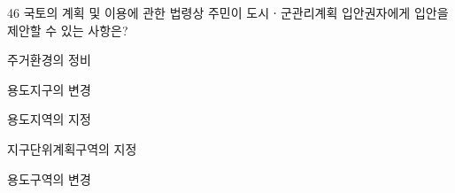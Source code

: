 \begin{question}{46}
국토의 계획 및 이용에 관한 법령상 주민이 도시ㆍ군관리계획 입안권자에게 입안을 제안할 수 있는 사항은?
\begin{choices}
  \item 주거환경의 정비
  \item 용도지구의 변경
  \item 용도지역의 지정
  \item 지구단위계획구역의 지정
  \item 용도구역의 변경
\end{choices}
\end{question}
